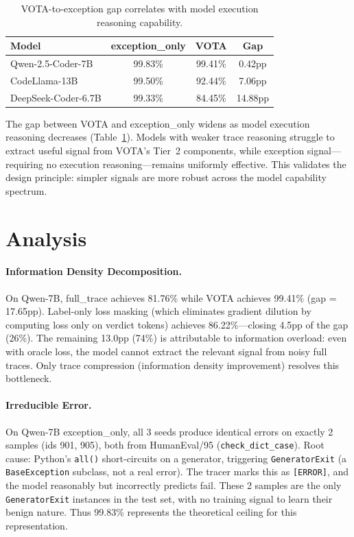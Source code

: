 \documentclass[11pt]{article}
\begin{document}
\begin{table}[h]
\centering
\caption{VOTA-to-exception gap correlates with model execution reasoning capability.}
\label{tab:gap}
\begin{tabular}{lccc}
\toprule
Model & exception\_only & VOTA & Gap \\
\midrule
Qwen-2.5-Coder-7B & 99.83\% & 99.41\% & 0.42pp \\
CodeLlama-13B & 99.50\% & 92.44\% & 7.06pp \\
DeepSeek-Coder-6.7B & 99.33\% & 84.45\% & 14.88pp \\
\bottomrule
\end{tabular}
\end{table}

The gap between VOTA and exception\_only widens as model execution reasoning decreases (Table~\ref{tab:gap}). Models with weaker trace reasoning struggle to extract useful signal from VOTA's Tier~2 components, while exception signal---requiring no execution reasoning---remains uniformly effective. This validates the design principle: simpler signals are more robust across the model capability spectrum.

\section{Analysis}

\paragraph{Information Density Decomposition.}
On Qwen-7B, full\_trace achieves 81.76\% while VOTA achieves 99.41\% (gap = 17.65pp). Label-only loss masking (which eliminates gradient dilution by computing loss only on verdict tokens) achieves 86.22\%---closing 4.5pp of the gap (26\%). The remaining 13.0pp (74\%) is attributable to information overload: even with oracle loss, the model cannot extract the relevant signal from noisy full traces. Only trace compression (information density improvement) resolves this bottleneck.

\paragraph{Irreducible Error.}
On Qwen-7B exception\_only, all 3 seeds produce identical errors on exactly 2 samples (ids 901, 905), both from HumanEval/95 (\texttt{check\_dict\_case}). Root cause: Python's \texttt{all()} short-circuits on a generator, triggering \texttt{GeneratorExit} (a \texttt{BaseException} subclass, not a real error). The tracer marks this as \texttt{[ERROR]}, and the model reasonably but incorrectly predicts fail. These 2 samples are the only \texttt{GeneratorExit} instances in the test set, with no training signal to learn their benign nature. Thus 99.83\% represents the theoretical ceiling for this representation.
\end{document}
